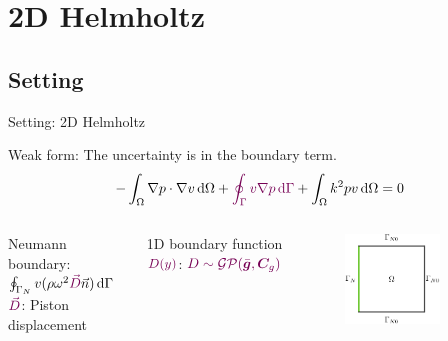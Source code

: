\documentclass[fleqn,11pt,aspectratio=43]{beamer}
\begin{document}
	
	
	
	

	

	
\section{2D Helmholtz}
\subsection{Setting}

\begin{frame}{Setting: 2D Helmholtz}
\begin{block}{Weak form:}
The \textcolor{DGTU}{uncertainty} is in the boundary term.
\begin{equation*}
-\int_{\Omega} \nabla p \cdot \nabla v \,\mathrm{d}\Omega + \textcolor{DGTU}{\oint_{\Gamma} v \nabla p  \,\mathrm{d}\Gamma}+ \int_{\Omega} k^2 pv \,\mathrm{d}\Omega = 0
\label{eqn:WeakHelmholtz}
\end{equation*}
\end{block}

\begin{columns}[onlytextwidth]
    \begin{block}{Neumann boundary:}
      $\oint_{\Gamma_N} v (\rho \omega^2 \textcolor{DGTU}{\vec{D}}\vec{n})  \,\mathrm{d}\Gamma$\\
      $\textcolor{DGTU}{\vec{D}}$: Piston displacement
          \end{block}
          1D boundary function $\textcolor{DGTU}{D(y)}$: $\textcolor{DGTU}{D \sim \mathcal{GP}(\bar{\bm{g}}, \bm{C}_g)}$
      	\begin{figure}[h]
		\begin{center}
		\includegraphics[width=0.75\textwidth]{BCsThesis1}
		\end{center}
		\end{figure}
  \end{columns}
\end{frame}
\end{document}
